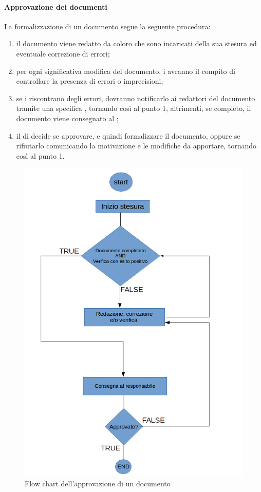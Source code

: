  \paragraph{Approvazione dei documenti}
La formalizzazione di un documento segue la seguente procedura:
\begin{enumerate}
	\item il documento viene redatto da coloro che sono incaricati della sua stesura ed eventuale correzione di errori;
	\item per ogni significativa modifica del documento, i \VERP{} avranno il compito di controllare la presenza di errori o imprecisioni;
	\item se i \VERP{} riscontrano degli errori, dovranno notificarlo ai redattori del documento tramite una specifica , tornando così al punto 1, altrimenti, se completo, il documento viene consegnato al \RESP{};
	\item il \RESP{} di  decide se approvare, e quindi formalizzare il documento, oppure se rifiutarlo comunicando la motivazione e le modifiche da apportare, tornando così al punto 1.
\end{enumerate}
\begin{figure}[h]
\centering
\includegraphics[scale=0.4]{img/flussoapprovazione.png}
\caption{Flow chart dell'approvazione di un documento}\label{sec:Figura2}
\end{figure}
